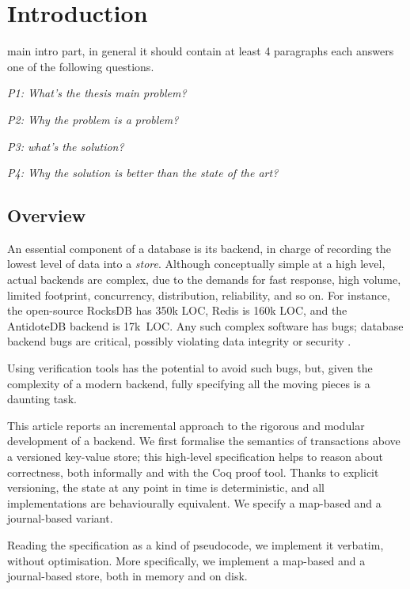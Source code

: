 %
\chapter{Introduction}
\label{sec:intro}



main intro part, in general it should contain at least 4 paragraphs each answers one of the following questions.

\emph{P1: What's the thesis main problem?}

\emph{P2: Why the problem is a problem?}

\emph{P3: what's the solution?}

\emph{P4: Why the solution is better than the state of the art?}

\section{Overview}
\label{sec:intro:overview}
An essential component of a database is its {backend}, in charge of
recording the lowest level of data into a \emph{store}.
Although conceptually simple at a high level, actual backends are
complex, due to the demands for fast response, high volume, limited
footprint, concurrency, distribution, reliability, and so on.
For instance, the open-source RocksDB has 350k LOC, Redis is 160k LOC,
and the AntidoteDB backend is 17k~LOC\@.
Any such complex software has bugs; database backend bugs are critical,
possibly violating data integrity or security \cite{rocksdbbug}.


Using verification tools has the potential to avoid such bugs, but,
given the complexity of a modern backend, fully specifying all the
moving pieces is a daunting task.

This article reports an incremental approach to the rigorous and modular
development of a backend.
We first formalise the semantics of transactions above a versioned
key-value store; this high-level specification helps to reason about
correctness, both informally and with the Coq proof tool.
Thanks to  explicit versioning, the state at any point in time is
deterministic, and all implementations are behaviourally equivalent.
We specify a map-based and a journal-based variant.

Reading the specification as a kind of pseudocode, we implement it
verbatim, without optimisation.
More specifically, we implement a map-based and a journal-based store,
both in memory and on disk.

